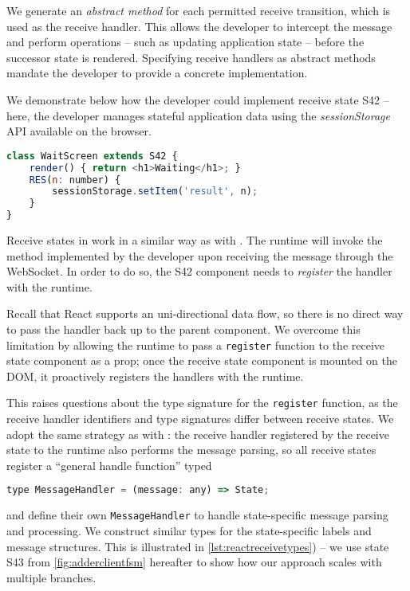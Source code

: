 We generate an \textit{abstract method} 
for each permitted receive
transition, which is used as the receive handler.
This allows the developer to intercept the
message and perform operations -- such as updating
application state -- before the successor state is rendered.
Specifying receive handlers as abstract methods mandate
the developer to provide a concrete implementation.

We demonstrate below how the developer could implement
receive state S42 -- here, the developer manages
stateful application data using the
\textit{sessionStorage} API \cite{SessionStorage}
available on the browser.

\begin{lstlisting}[language=javascript]
class WaitScreen extends S42 {
	render() { return <h1>Waiting</h1>; }
	RES(n: number) {
		sessionStorage.setItem('result', n);
	}
}
\end{lstlisting}

Receive states in 
work in a similar way as with .
The runtime will invoke the  method
implemented by the developer upon receiving the message
through the WebSocket.
In order to do so, the S42 component 
needs to \textit{register}
the handler with the runtime.

Recall that React supports an uni-directional data flow,
so there is no direct way to pass the handler
back up to the parent component.
We overcome this limitation by allowing the
runtime to pass a \texttt{register} function to the
receive state component as a prop; once the receive state
component is mounted on the DOM, it proactively 
registers the handlers with the runtime.

This raises questions about the type signature for the
\texttt{register} function, as the receive handler
identifiers and type signatures differ between receive states.
We adopt the same strategy as with :
the receive handler registered by the receive state
to the runtime also performs the message parsing,
so all receive states register a ``general handle function'' typed

\begin{lstlisting}[language=javascript,numbers=none]
type MessageHandler = (message: any) => State;
\end{lstlisting}

and define their own \texttt{MessageHandler} to handle
state-specific message parsing and processing.
We construct similar types for the state-specific
labels and message structures.
This is illustrated in \cref{lst:reactreceivetypes}) --
we use state S43 from \cref{fig:adderclientfsm} hereafter
to show how our approach scales with multiple branches.

